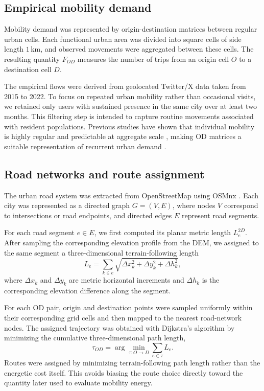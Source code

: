 \documentclass[twocolumn,amsmath,amssymb,floatfix,nature,shownopacs,footinbib,superscriptaddress]{revtex4-2}
\begin{document}
\subsection*{Empirical mobility demand}

Mobility demand was represented by origin-destination matrices between regular urban cells. Each functional urban area was divided into square cells of side length $1\,\mathrm{km}$, and observed movements were aggregated between these cells. The resulting quantity $F_{OD}$ measures the number of trips from an origin cell $O$ to a destination cell $D$.

The empirical flows were derived from geolocated Twitter/X data taken from 2015 to 2022. To focus on repeated urban mobility rather than occasional visits, we retained only users with sustained presence in the same city over at least two months. This filtering step is intended to capture routine movements associated with resident populations. Previous studies have shown that individual mobility is highly regular and predictable at aggregate scale \cite{gonzalez2008understanding, song2010limits}, making OD matrices a suitable representation of recurrent urban demand \cite{bassolas2019hierarchical}.

\subsection*{Road networks and route assignment}

The urban road system was extracted from OpenStreetMap using OSMnx \cite{boeing2017,boeing2025modeling}. Each city was represented as a directed graph $G=(V,E)$, where nodes $V$ correspond to intersections or road endpoints, and directed edges $E$ represent road segments.

For each road segment $e\in E$, we first computed its planar metric length $L_e^{2D}$. After sampling the corresponding elevation profile from the DEM, we assigned to the same segment a three-dimensional terrain-following length
\begin{equation}
    L_e = \sum_{k \in e}\sqrt{\Delta x_k^2+\Delta y_k^2+\Delta h_k^2},
\end{equation}
where $\Delta x_k$ and $\Delta y_k$ are metric horizontal increments and $\Delta h_k$ is the corresponding elevation difference along the segment.

For each OD pair, origin and destination points were sampled uniformly within their corresponding grid cells and then mapped to the nearest road-network nodes. The assigned trajectory was obtained with Dijkstra's algorithm by minimizing the cumulative three-dimensional path length,
\begin{equation*}
\tau_{OD} = \arg\min_{\tau:O\rightarrow D} \sum_{e\in \tau} L_e.
\end{equation*}
Routes were assigned by minimizing terrain-following path length rather than the energetic cost itself. This avoids biasing the route choice directly toward the quantity later used to evaluate mobility energy.
\end{document}
